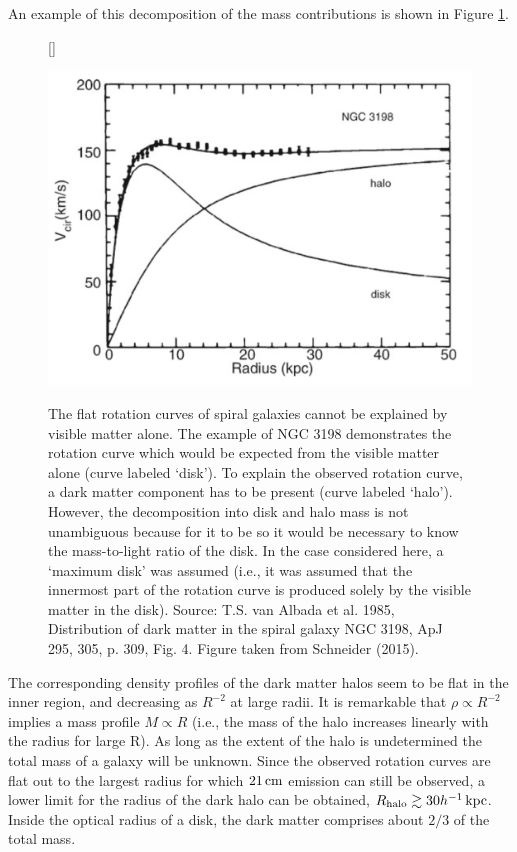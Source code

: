 \documentclass[a4paper,10pt]{article}
\begin{document}
{\noindent}An example of this decomposition of the mass contributions is shown in Figure \ref{fig:rotationcurvedecomp}.

\begin{figure}[h]
    [\FBwidth]
    {\caption{\footnotesize{The flat rotation curves of spiral galaxies cannot be explained by visible matter alone. The example of NGC 3198 demonstrates the rotation curve which would be expected from the visible matter alone (curve labeled `disk'). To explain the observed rotation curve, a dark matter component has to be present (curve labeled `halo'). However, the decomposition into disk and halo mass is not unambiguous because for it to be so it would be necessary to know the mass-to-light ratio of the disk. In the case considered here, a `maximum disk' was assumed (i.e., it was assumed that the innermost part of the rotation curve is produced solely by the visible matter in the disk). Source: T.S. van Albada et al. 1985, Distribution of dark matter in the spiral galaxy NGC 3198, ApJ 295, 305, p. 309, Fig. 4. Figure taken from Schneider (2015).}}
    \label{fig:rotationcurvedecomp}}
    {\includegraphics[width=12cm]{figures/RotationCurve_decomp.png}}
\end{figure}

{\noindent}The corresponding density profiles of the dark matter halos seem to be flat in the inner region, and decreasing as $R^{-2}$ at large radii. It is remarkable that $\rho\propto R^{-2}$ implies a mass profile $M\propto R$ (i.e., the mass of the halo increases linearly with the radius for large R). As long as the extent of the halo is undetermined the total mass of a galaxy will be unknown. Since the observed rotation curves are flat out to the largest radius for which $21\,{\rm cm}$ emission can still be observed, a lower limit for the radius of the dark halo can be obtained, $R_{\rm halo}\gtrsim30h^{-1}\,{\rm kpc}$. Inside the optical radius of a disk, the dark matter comprises about $2/3$ of the total mass.
\end{document}

